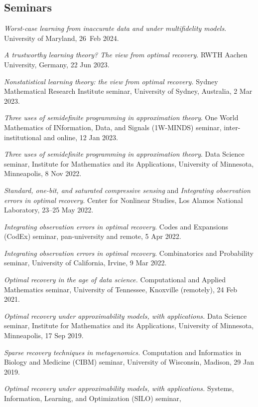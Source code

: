 \documentclass[11pt]{article}
\begin{document}
\subsection{Seminars}
\bitemize
\item {\sl Worst-case learning from inaccurate data and under multifidelity models}.
University of Maryland, 26~Feb 2024.
\item {\sl A trustworthy learning theory? The view from optimal recovery}.
RWTH Aachen University, Germany, 22 Jun 2023.
\item {\sl Nonstatistical learning theory: the view from optimal recovery.}
Sydney Mathematical Research Institute seminar,
University of Sydney, Australia, 2 Mar 2023.
\item {\sl Three uses of semidefinite programming in approximation theory}.
One World Mathematics of INformation, Data, and Signals (1W-MINDS) seminar,
inter-institutional and online, 12 Jan 2023.
\item {\sl Three uses of semidefinite programming in approximation theory}.
 Data Science seminar,
 Institute for Mathematics and its Applications,
 University of Minnesota, Minneapolis, 8 Nov 2022.
\item {\sl Standard,  one-bit, and saturated compressive sensing} and {\sl Integrating observation errors in optimal recovery}.
Center for Nonlinear Studies, Los Alamos National Laboratory, 23--25 May 2022.
\item {\sl Integrating observation errors in optimal recovery}.  Codes and Expansions (CodEx) seminar,
pan-university and remote, 5 Apr 2022.
\item {\sl Integrating observation errors in optimal recovery}.
Combinatorics  and Probability seminar, 
University of California, Irvine, 9 Mar 2022.
\item {\sl Optimal recovery in the age of data science.}
Computational and Applied Mathematics seminar,
University of Tennessee, Knoxville (remotely), 24 Feb 2021.
\item {\sl Optimal recovery under approximability models, with applications.}
 Data Science seminar,
 Institute for Mathematics and its Applications,
 University of Minnesota, Minneapolis, 17 Sep 2019.
\item {\sl Sparse recovery techniques in metagenomics.}
Computation and Informatics in Biology and Medicine (CIBM) seminar,
University of Wisconsin, Madison, 29 Jan 2019.
\item {\sl Optimal recovery under approximability models, with applications.}
Systems, Information, Learning, and Optimization (SILO) seminar,
\end{document}
